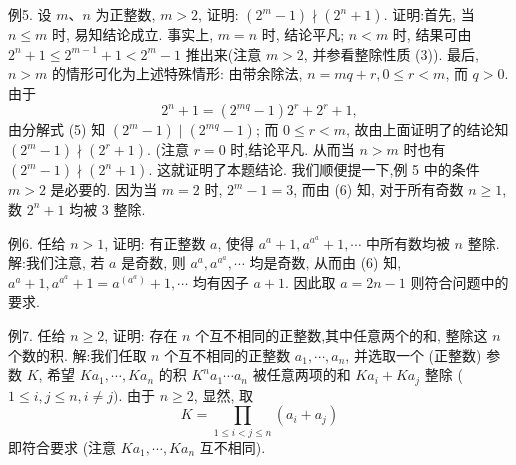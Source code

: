 例5. 设 $m 、 n$ 为正整数, $m>2$, 证明: $\left(2^m-1\right) \nmid\left(2^n+1\right)$.
证明:首先, 当 $n \leqslant m$ 时, 易知结论成立.
事实上, $m=n$ 时, 结论平凡; $n<m$ 时, 结果可由 $2^n+1 \leqslant 2^{m-1}+1<2^m-1$ 推出来(注意 $m>2$, 并参看整除性质 (3)).
最后, $n>m$ 的情形可化为上述特殊情形: 由带余除法, $n=m q+r, 0 \leqslant r<m$, 而 $q>0$. 由于
$$
2^n+1=\left(2^{m q}-1\right) 2^r+2^r+1,
$$
由分解式 (5) 知 $\left(2^m-1\right) \mid\left(2^{m q}-1\right)$; 而 $0 \leqslant r<m$, 故由上面证明了的结论知 $\left(2^m-1\right) \nmid\left(2^r+1\right)$. (注意 $r=0$ 时,结论平凡.
 从而当 $n>m$ 时也有 $\left(2^m-1\right) \nmid\left(2^n+1\right)$. 这就证明了本题结论.
我们顺便提一下,例 5 中的条件 $m>2$ 是必要的.
因为当 $m=2$ 时, $2^m- 1=3$, 而由 (6) 知, 对于所有奇数 $n \geqslant 1$, 数 $2^n+1$ 均被 3 整除.



例6. 任给 $n>1$, 证明: 有正整数 $a$, 使得 $a^a+1, a^{a^a}+1, \cdots$ 中所有数均被 $n$ 整除.
解:我们注意, 若 $a$ 是奇数, 则 $a^a, a^{a^a}, \cdots$ 均是奇数, 从而由 (6) 知, $a^a+ 1, a^{a^a}+1=a^{\left(a^a\right)}+1, \cdots$ 均有因子 $a+1$. 因此取 $a=2 n-1$ 则符合问题中的要求.



例7. 任给 $n \geqslant 2$, 证明: 存在 $n$ 个互不相同的正整数,其中任意两个的和, 整除这 $n$ 个数的积.
解:我们任取 $n$ 个互不相同的正整数 $a_1, \cdots, a_n$, 并选取一个 (正整数) 参数 $K$, 希望 $K a_1, \cdots, K a_n$ 的积 $K^n a_1 \cdots a_n$ 被任意两项的和 $K a_i+K a_j$ 整除 ( $1 \leqslant i, j \leqslant n, i \neq j)$. 由于 $n \geqslant 2$, 显然, 取
$$
K=\prod_{1 \leqslant i<j \leqslant n}\left(a_i+a_j\right)
$$
即符合要求 (注意 $K a_1, \cdots, K a_n$ 互不相同).


